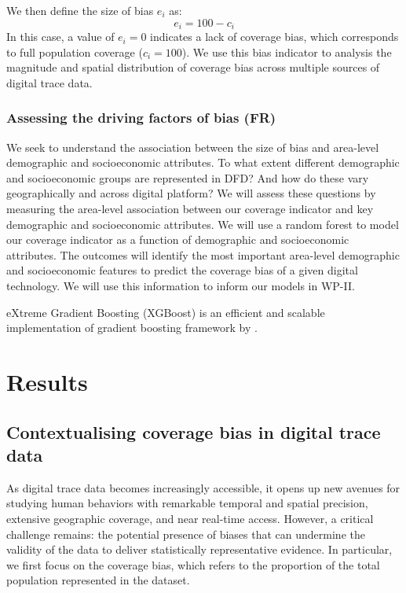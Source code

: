 \documentclass[]{rsos}%
\begin{document}
We then define the size of bias \(e_i\) as: \begin{equation}
e_i = 100 - c_i
\end{equation} In this case, a value of \(e_i = 0\) indicates a lack of
coverage bias, which corresponds to full population coverage
(\(c_i = 100\)). We use this bias indicator to analysis the magnitude and
spatial distribution of coverage bias across multiple sources of digital
trace data.

\hypertarget{assessing-the-driving-factors-of-bias-fr}{%
\subsubsection{Assessing the driving factors of bias (FR)}\label{assessing-the-driving-factors-of-bias-fr}}

We seek to understand the association between the size of bias and
area-level demographic and socioeconomic attributes. To what extent
different demographic and socioeconomic groups are represented in DFD?
And how do these vary geographically and across digital platform? We
will assess these questions by measuring the area-level association
between our coverage indicator and key demographic and socioeconomic
attributes. We will use a random forest to model our coverage indicator
as a function of demographic and socioeconomic attributes. The outcomes
will identify the most important area-level demographic and
socioeconomic features to predict the coverage bias of a given digital
technology. We will use this information to inform our models in WP-II.

eXtreme Gradient Boosting (XGBoost) is an efficient and scalable
implementation of gradient boosting framework by \citep{friedman2001, friedman2000}.

\hypertarget{results}{%
\section{Results}\label{results}}

\hypertarget{contextualising-coverage-bias-in-digital-trace-data}{%
\subsection{Contextualising coverage bias in digital trace data}\label{contextualising-coverage-bias-in-digital-trace-data}}

As digital trace data becomes increasingly accessible, it opens up new
avenues for studying human behaviors with remarkable temporal and
spatial precision, extensive geographic coverage, and near real-time
access. However, a critical challenge remains: the potential presence of
biases that can undermine the validity of the data to deliver
statistically representative evidence. In particular, we first focus on
the coverage bias, which refers to the proportion of the total
population represented in the dataset.
\end{document}
